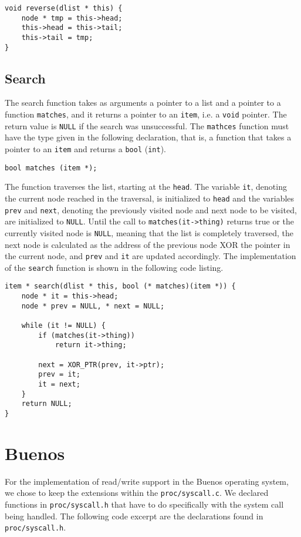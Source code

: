 \documentclass[11pt]{article}
\newcommand{\code}[1]{{\tt #1}}
\newcommand{\file}[1]{{\tt #1}}
\begin{document}
\begin{lstlisting}
void reverse(dlist * this) {
    node * tmp = this->head;
    this->head = this->tail;
    this->tail = tmp;
}
\end{lstlisting}

\subsection{Search}
The search function takes as arguments a pointer to a list and a pointer to a
function \code{matches}, and it returns a pointer to an \code{item}, i.e. a
\code{void} pointer. The return value is \code{NULL} if the search was
unsuccessful. The \code{mathces} function must have the type given in the
following declaration, that is, a function that takes a pointer to an
\code{item} and returns a \code{bool} (\code{int}).
\begin{lstlisting}
bool matches (item *);
\end{lstlisting}
The function traverses the list, starting at the \code{head}. The variable
\code{it}, denoting the current node reached in the traversal, is initialized to
\code{head} and the variables \code{prev} and \code{next}, denoting the
previously visited node and next node to be visited, are initialized to
\code{NULL}. Until the call to \code{matches(it->thing)} returns true or the
currently visited node is \code{NULL}, meaning that the list is completely
traversed, the next node is calculated as the address of the previous node XOR
the pointer in the current node, and \code{prev} and \code{it} are updated
accordingly. The implementation of the \code{search} function is shown in the
following code listing.
\begin{lstlisting}
item * search(dlist * this, bool (* matches)(item *)) {
    node * it = this->head;
    node * prev = NULL, * next = NULL;

    while (it != NULL) {
        if (matches(it->thing))
            return it->thing;

        next = XOR_PTR(prev, it->ptr);
        prev = it;
        it = next;
    }
    return NULL;
}
\end{lstlisting}

\newpage
\section{Buenos}
For the implementation of read/write support in the Buenos operating system,
we chose to keep the extensions within the \file{proc/syscall.c}. We declared
functions in \file{proc/syscall.h} that have to do specifically with the
system call being handled. The following code excerpt are the declarations
found in \file{proc/syscall.h}.
\end{document}
